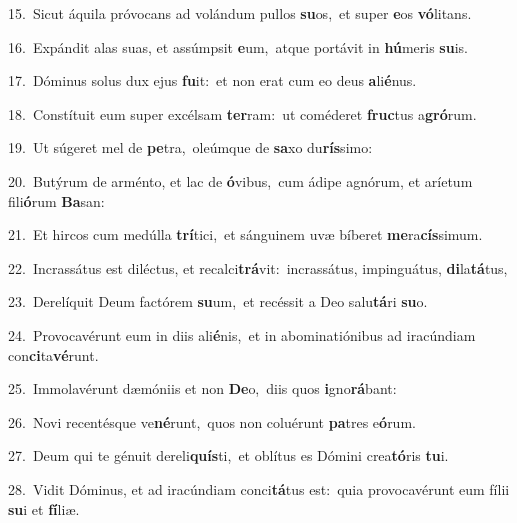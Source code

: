 {\numbfont\textcolor{\numbcolor}{15.}}~Sicut áquila próvocans ad volándum pullos \textbf{su}\-os,~\star et super \textbf{e}\-os \textbf{vó}\-litans.\par
{\numbfont\textcolor{\numbcolor}{16.}}~Expándit alas suas, et assúmpsit \textbf{e}\-um,~\star atque portávit in \textbf{hú}\-meris \textbf{su}\-is.\par
{\numbfont\textcolor{\numbcolor}{17.}}~Dóminus solus dux ejus \textbf{fu}\-it:~\star et non erat cum eo deus \textbf{a}\-li\-\textbf{é}\-nus.\par
{\numbfont\textcolor{\numbcolor}{18.}}~Constítuit eum super excélsam \textbf{ter}\-ram:~\star ut coméderet \textbf{fruc}\-tus a\-\textbf{gró}\-rum.\par
{\numbfont\textcolor{\numbcolor}{19.}}~Ut súgeret mel de \textbf{pe}\-tra,~\star oleúmque de \textbf{sa}\-xo du\-\textbf{rís}\-simo:\par
{\numbfont\textcolor{\numbcolor}{20.}}~Butýrum de arménto, et lac de \textbf{ó}\-vibus,~\star cum ádipe agnórum, et aríetum fili\-\textbf{ó}\-rum \textbf{Ba}\-san:\par
{\numbfont\textcolor{\numbcolor}{21.}}~Et hircos cum medúlla \textbf{trí}\-tici,~\star et sánguinem uvæ bíberet \textbf{me}\-ra\-\textbf{cís}\-simum.\par
{\numbfont\textcolor{\numbcolor}{22.}}~Incrassátus est diléctus, et recalci\-\textbf{trá}\-vit:~\star incrassátus, impinguátus, \textbf{di}\-la\-\textbf{tá}\-tus,\par
{\numbfont\textcolor{\numbcolor}{23.}}~Derelíquit Deum factórem \textbf{su}\-um,~\star et recéssit a Deo salu\-\textbf{tá}\-ri \textbf{su}\-o.\par
{\numbfont\textcolor{\numbcolor}{24.}}~Provocavérunt eum in diis ali\-\textbf{é}\-nis,~\star et in abominatiónibus ad iracúndiam con\-\textbf{ci}\-ta\-\textbf{vé}\-runt.\par
{\numbfont\textcolor{\numbcolor}{25.}}~Immolavérunt dæmóniis et non \textbf{De}\-o,~\star diis quos \textbf{i}\-gno\-\textbf{rá}\-bant:\par
{\numbfont\textcolor{\numbcolor}{26.}}~Novi recentésque ve\-\textbf{né}\-runt,~\star quos non coluérunt \textbf{pa}\-tres e\-\textbf{ó}\-rum.\par
{\numbfont\textcolor{\numbcolor}{27.}}~Deum qui te génuit dereli\-\textbf{quís}\-ti,~\star et oblítus es Dómini crea\-\textbf{tó}\-ris \textbf{tu}\-i.\par
{\numbfont\textcolor{\numbcolor}{28.}}~Vidit Dóminus, et ad iracúndiam conci\-\textbf{tá}\-tus est:~\star quia provocavérunt eum fílii \textbf{su}\-i et \textbf{fí}\-liæ.\par
